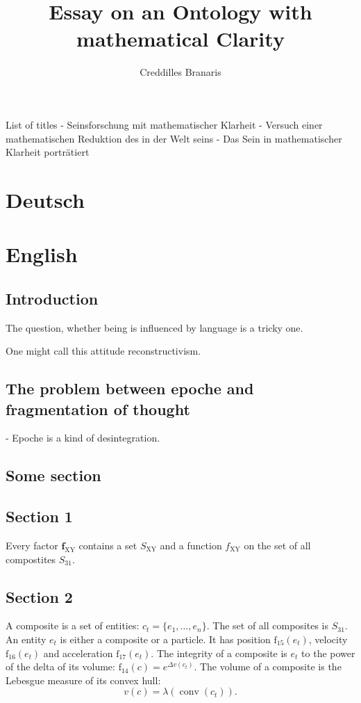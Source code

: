 \documentclass[12pt]{article}
\title{Essay on an Ontology with mathematical Clarity}
\author{Creddilles Branaris}
\begin{document}
\maketitle

List of titles
- Seinsforschung mit mathematischer Klarheit
- Versuch einer mathematischen Reduktion des in der Welt seins
- Das Sein in mathematischer Klarheit porträtiert

\section{Deutsch}





\section{English}

\subsection{Introduction}
The question, whether being is influenced by language is a tricky one. 

One might call this attitude reconstructivism.

\subsection{The problem between epoche and fragmentation of thought}

- Epoche is a kind of desintegration.

\subsection{Some section}



\subsection{Section 1}

Every factor $\textbf{f}_{\text{XY}}$ contains a set $S_{\text{XY}}$ and a function $f_{\text{XY}}$ on the set of all compostites $S_{31}$. 

\subsection{Section 2}

A composite is a set of entities:
\( c_t = \{ e_1, \dots, e_n \}.\)
The set of all composites is $S_{31}$. An entity $e_t$ is either a composite or a particle. It has position $\text{f}_{15}(e_t)$, velocity $\text{f}_{16}(e_t)$ and acceleration $\text{f}_{17}(e_t)$. The integrity of a composite is $e_t$ to the power of the delta of its volume:
\(
\text{f}_{14}(c) = e^{\Delta v(c_t)}.
\)
The volume of a composite is the Lebesgue measure of its convex hull:
\[
v(c) = \lambda(\operatorname{conv}(c_t)).
\]
\end{document}
